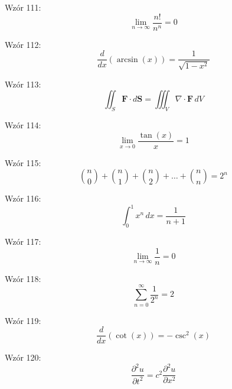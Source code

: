 \documentclass{article}
\begin{document}
Wzór 111:
\[ \lim_{{n \to \infty}} \frac{n!}{n^n} = 0 \]

Wzór 112:
\[ \frac{d}{dx}\left(\arcsin(x)\right) = \frac{1}{\sqrt{1-x^2}} \]

Wzór 113:
\[ \iint_S \mathbf{F} \cdot d\mathbf{S} = \iiint_V \nabla \cdot \mathbf{F} \,dV \]

Wzór 114:
\[ \lim_{{x \to 0}} \frac{\tan(x)}{x} = 1 \]

Wzór 115:
\[ \binom{n}{0} + \binom{n}{1} + \binom{n}{2} + \ldots + \binom{n}{n} = 2^n \]

Wzór 116:
\[ \int_{0}^{1} x^n \,dx = \frac{1}{n+1} \]

Wzór 117:
\[ \lim_{{n \to \infty}} \frac{1}{n} = 0 \]

Wzór 118:
\[ \sum_{n=0}^{\infty} \frac{1}{2^n} = 2 \]

Wzór 119:
\[ \frac{d}{dx}\left(\cot(x)\right) = -\csc^2(x) \]

Wzór 120:
\[ \frac{\partial^2u}{\partial t^2} = c^2 \frac{\partial^2u}{\partial x^2} \]
\end{document}
